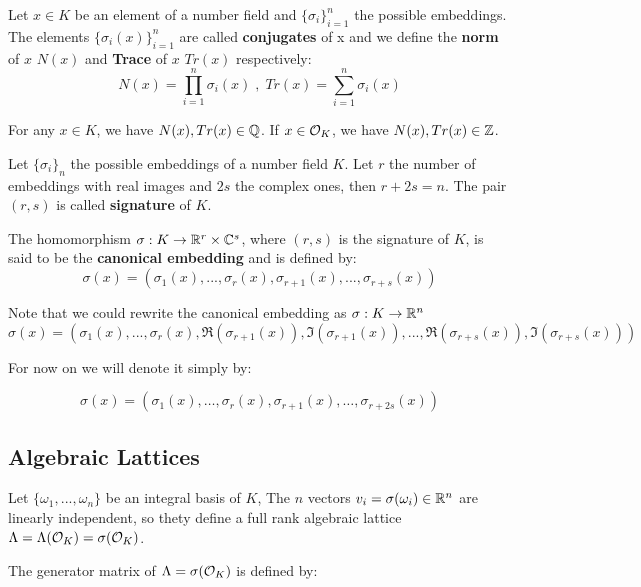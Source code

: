 \documentclass[Ingles]{ic-tese-v3}
\begin{document}
      \begin{definition}
  \label{def:trace-and-norm}
  Let $x \in K$ be an element of a number field and $\{\sigma_i\}_{i=1}^n$ the possible
  embeddings. The elements $\{\sigma_i(x)\}_{i=1}^n$ are called \textbf{conjugates} of
  x and we define the \textbf{norm} of $x$ $N(x)$ and \textbf{Trace} of $x$ $Tr(x)$
  respectively:
  $$
  N(x) = \prod_{i=1}^n{\sigma_i(x)} \;,\;   Tr(x) = \sum_{i=1}^n{\sigma_i(x)}
  $$

\end{definition}
\begin{theorem}
  For any $x \in K$, we have $N(x), Tr(x) \in \mathbb{Q}$. If $x \in \mathcal{O}_K$, we have $N(x),
  Tr(x) \in \mathbb{Z}$.
\end{theorem}


   \begin{definition}
Let $\{\sigma_i\}_n$ the possible embeddings of a number field $K$. Let $r$ the number of embeddings with real images and $2s$ the complex ones, then
$r + 2s = n$. The pair $\left(r,s\right)$ is called \textbf{signature} of $K$.
\end{definition}

   \begin{definition}\label{def:canonical-embedding}
The homomorphism $\sigma: K \rightarrow \mathbb{R}^r \times \mathbb{C}^s$, where $(r,s)$ is the signature of $K$, is
said to be the \textbf{canonical embedding} and is defined by:
$$
\sigma(x) = \left(\sigma_1(x), ... , \sigma_r(x), \sigma_{r+1}(x), ..., \sigma_{r+s}(x) \right)
$$

Note that we could rewrite the canonical embedding as $\sigma : K \rightarrow \mathbb{R}^n$
$$
\sigma(x) = \left( \sigma_1(x), ... , \sigma_r(x), \Re(\sigma_{r+1}(x)), \Im(\sigma_{r+1}(x)), ...,
  \Re(\sigma_{r+s}(x)), \Im(\sigma_{r+s}(x)) \right)
$$

For now on we will denote it simply by:

$$
\sigma(x) = \left( \sigma_1(x), \dots , \sigma_r(x), \sigma_{r+1}(x), \dots, \sigma_{r+2s}(x) \right)
$$

\end{definition}

\subsection{Algebraic Lattices}
\label{sec:org57530b5}

\begin{theorem}\label{theo:algebraic-lattice}
Let $\{\omega_1,...,\omega_n\}$ be an integral basis of $K$, The $n$ vectors $v_i = \sigma(\omega_i)
\in \mathbb{R}^n$ are linearly independent, so thety define a full rank algebraic lattice
$\Lambda = \Lambda(\mathcal{O}_K) = \sigma(\mathcal{O}_K)$.
\end{theorem} 
The generator matrix of \(\Lambda = \sigma(\mathcal{O}_K)\) is defined by:
\end{document}
